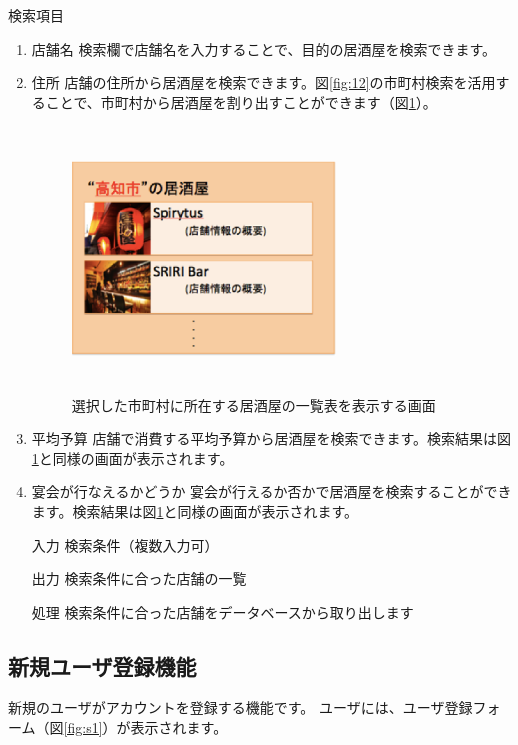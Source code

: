 \documentclass[a4j,titlepage]{jarticle}
\begin{document}
検索項目
\begin{enumerate}
\item 店舗名
検索欄で店舗名を入力することで、目的の居酒屋を検索できます。

\item 住所
店舗の住所から居酒屋を検索できます。図\ref{fig:12}の市町村検索を活用することで、市町村から居酒屋を割り出すことができます（図\ref{fig:13}）。

\begin {figure}[htbp]
    \begin{center}
    \includegraphics [height=7cm, width=7cm]{extrnal_design_document_image/13.eps}
    \caption {選択した市町村に所在する居酒屋の一覧表を表示する画面}
    \label {fig:13}
    \end{center}
\end {figure}

\item 平均予算
店舗で消費する平均予算から居酒屋を検索できます。検索結果は図\ref{fig:13}と同様の画面が表示されます。


\item 宴会が行なえるかどうか
宴会が行えるか否かで居酒屋を検索することができます。検索結果は図\ref{fig:13}と同様の画面が表示されます。

\end{enumerate}

\begin{enumerate}
\item [入力] 検索条件（複数入力可）
\item [出力] 検索条件に合った店舗の一覧
\item [処理] 検索条件に合った店舗をデータベースから取り出します
\end{enumerate}


\subsection{新規ユーザ登録機能}
新規のユーザがアカウントを登録する機能です。
ユーザには、ユーザ登録フォーム（図\ref{fig:s1}）が表示されます。
\end{document}
